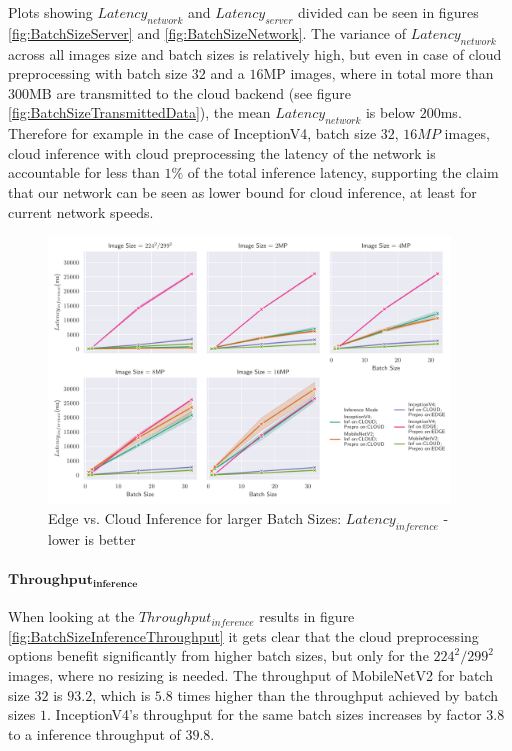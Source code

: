 Plots showing $Latency_{network}$ and $Latency_{server}$ divided can be seen in figures \ref{fig:BatchSizeServer} and \ref{fig:BatchSizeNetwork}.
The variance of $Latency_{network}$ across all images size and batch sizes is relatively high, but even in case of cloud preprocessing with batch size $32$ and a $16$MP images, where in total more than $300$MB are transmitted to the cloud backend (see figure \ref{fig:BatchSizeTransmittedData}), the mean $Latency_{network}$ is below $200$ms. 
Therefore for example in the case of InceptionV4, batch size $32$, $16MP$ images, cloud inference with cloud preprocessing the latency of the network is accountable for less than $1\%$ of the total inference latency, supporting the claim that our network can be seen as lower bound for cloud inference, at least for current network speeds.

\begin{figure}[!htb]
\centering
\includegraphics[width=0.95\textwidth]{./Bilder/single_plots/batch_size_plots/Effects_of_Batch_size_Inference_Latencies.pdf}
\caption{Edge vs. Cloud Inference for larger Batch Sizes:  $Latency_{inference}$ - lower is better}
\label{fig:BatchSizeInferenceLatency}
\end{figure}


\paragraph{$\mathbf{Throughput_{inference}}$}
When looking at the $Throughput_{inference}$ results in figure \ref{fig:BatchSizeInferenceThroughput} it gets clear that the cloud preprocessing options benefit significantly from higher batch sizes, but only for the $224^2/299^2$ images, where no resizing is needed.
The throughput of MobileNetV2 for batch size $32$ is $93.2$, which is $5.8$ times higher than the throughput achieved by batch sizes $1$. 
InceptionV4's throughput for the same batch sizes increases by factor $3.8$ to a inference throughput of $39.8$.

